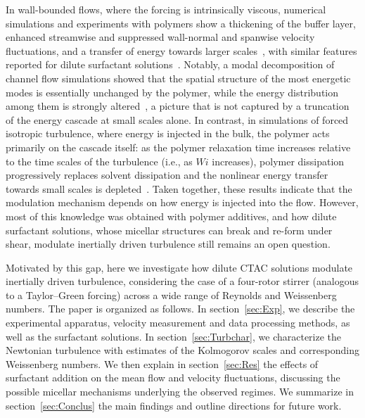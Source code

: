 \documentclass[aps,prfluids,groupedaddress,showkeys,11pt,tightenlines]{revtex4-2}
\begin{document}
In wall-bounded flows, where the forcing is intrinsically viscous, numerical simulations and experiments with polymers show a thickening of the buffer layer, enhanced streamwise and suppressed wall-normal and spanwise velocity fluctuations, and a transfer of energy towards larger scales~\cite{dentoonder1997drag,deangelis2003drag}, with similar features reported for dilute surfactant solutions~\cite{li_experimental_2008,motozawa_experimental_2011,ge2007surfactant}. Notably, a modal decomposition of channel flow simulations showed that the spatial structure of the most energetic modes is essentially unchanged by the polymer, while the energy distribution among them is strongly altered~\cite{deangelis2003drag}, a picture that is not captured by a truncation of the energy cascade at small scales alone. In contrast, in simulations of forced isotropic turbulence, where energy is injected in the bulk, the polymer acts primarily on the cascade itself: as the polymer relaxation time increases relative to the time scales of the turbulence (i.e., as $Wi$ increases), polymer dissipation progressively replaces solvent dissipation and the nonlinear energy transfer towards small scales is depleted~\cite{valente2014effect,ferreira2016large}. Taken together, these results indicate that the modulation mechanism depends on how energy is injected into the flow. However, most of this knowledge was obtained with polymer additives, and how dilute surfactant solutions, whose micellar structures can break and re-form under shear, modulate inertially driven turbulence still remains an open question.


Motivated by this gap, here we investigate how dilute CTAC solutions modulate inertially driven turbulence, considering the case of a four-rotor stirrer (analogous to a Taylor--Green forcing) across a wide range of Reynolds and Weissenberg numbers. The paper is organized as follows. In section~\ref{sec:Exp}, we describe the experimental apparatus, velocity measurement and data processing methods, as well as the surfactant solutions. In section~\ref{sec:Turbchar}, we characterize the Newtonian turbulence with estimates of the Kolmogorov scales and corresponding Weissenberg numbers. We then explain in section~\ref{sec:Res} the effects of surfactant addition on the mean flow and velocity fluctuations, discussing the possible micellar mechanisms underlying the observed regimes. We summarize in section~\ref{sec:Conclus} the main findings and outline directions for future work.
\end{document}
